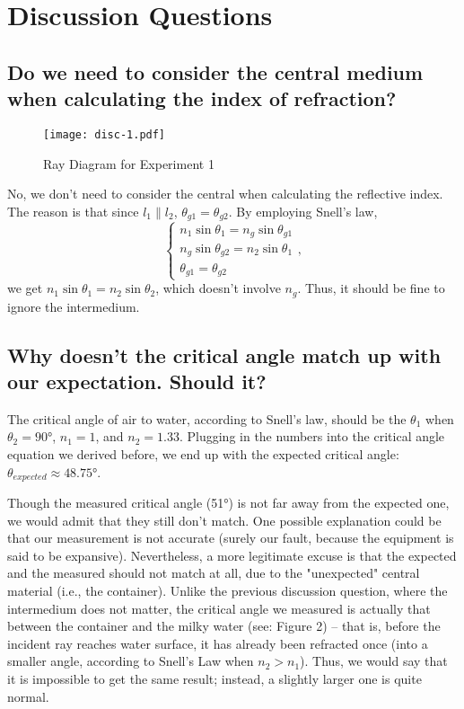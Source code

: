 \documentclass{elegantpaper}
\begin{document}
\section{Discussion Questions}
\subsection{Do we need to consider the central medium when calculating the index of refraction?}
\begin{figure}[!ht]
	\centering
	\texttt{[image: disc-1.pdf]}
	\caption{Ray Diagram for Experiment 1}
	\centering
  \label{label:Disc-1}
\end{figure}
No, we don't need to consider the central when calculating the reflective index. The reason is that since $l_1 \parallel l_2$, $\theta_{g1}=\theta_{g2}$. By employing Snell's law,
\begin{equation*}
  \begin{cases}
    n_1\sin{\theta_1}=n_g\sin{\theta_{g1}}\\
    n_g\sin{\theta_{g2}}=n_2\sin{\theta_1}\\
    \theta_{g1}=\theta_{g2}
  \end{cases},
\end{equation*}
we get $n_1\sin{\theta_1}=n_2\sin{\theta_2}$, which doesn't involve $n_g$. Thus, it should be fine to ignore the intermedium.
\subsection{Why doesn't the critical angle match up with our expectation. Should it?}
The critical angle of air to water, according to Snell's law, should be the $\theta_1$ when $\theta_2=\ang{90}$, $n_1=1$, and $n_2=1.33$. Plugging in the numbers into the critical angle equation we derived before, we end up with the expected critical angle: $\theta_{expected}\approx\ang{48.75}$.

Though the measured critical angle (\ang{51}) is not far away from the expected one, we would admit that they still don't match. One possible explanation could be that our measurement is not accurate (surely our fault, because the equipment is said to be expansive). Nevertheless, a more legitimate excuse is that the expected and the measured should not match at all, due to the "unexpected" central material (i.e., the container). Unlike the previous discussion question, where the intermedium does not matter, the critical angle we measured is actually that between the container and the milky water (see: Figure 2) -- that is, before the incident ray reaches water surface, it has already been refracted once (into a smaller angle, according to Snell's Law when $n_2>n_1$). Thus, we would say that it is impossible to get the same result; instead, a slightly larger one is quite normal. 
\clearpage
\end{document}
